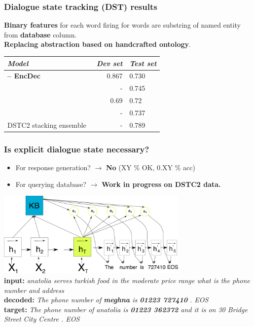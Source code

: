 \documentclass[10pt, compress,british,xcolor={svgnames,dvipsnames,x11names},trans]{beamer}
\begin{document}
\begin{frame}\frametitle{Dialogue state tracking (DST) results}
\begin{center}
    {\bf Binary features} for each word firing for words are substring of named entity from {\bf database} column. \\
        \footnotesize{{\bf Replacing abstraction based on handcrafted ontology}.} \\
    \vfill
\begin{tabular}{l@{\quad}rll}
\hline
\multicolumn{1}{l}{\rule{0pt}{12pt}
                   {\it Model}}&\multicolumn{1}{l}{\it Dev set}&\multicolumn{2}{l}{\it Test set}\\[2pt]
\hline\rule{0pt}{12pt}
    {\bf \citet{platek2016recurrent} -- EncDec} &   0.867 & 0.730 \\
\hline
    \citet{vodolan_hybrid_2015} & - & 0.745 \\
    \citet{zilka_incremental_2015} & 0.69 & 0.72 \\
    \citet{henderson2013deep} & - & 0.737 \\
\hline
    DSTC2 stacking ensemble~\cite{henderson2014second} & - & 0.789 \\
\hline
\end{tabular}
\end{center}
\end{frame}

\begin{frame}\frametitle{Is explicit dialogue state necessary?}
    \begin{itemize}
        \item For response generation? $\longrightarrow$ {\bf No} {\footnotesize (XY \% OK, 0.XY \% acc)}
        \item For querying database? $\longrightarrow$ {\bf Work in progress on DSTC2 data.}
    \end{itemize}
    \includegraphics[width=0.7\textwidth]{./encdecdb.pdf} \\
    {\bf input:} {\it anatolia serves turkish food in the moderate price range what is the phone number and address} \\
    {\bf decoded:} {\it The phone number of {\bf meghna} is {\bf 01223 727410} . EOS} \\
    {\bf target:} {\it The phone number of anatolia is {\bf 01223 362372} and it is on 30 Bridge Street City Centre . EOS } \\
\end{frame}
\end{document}
